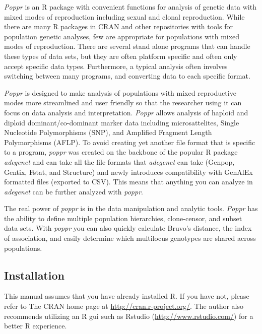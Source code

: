 \documentclass[letterpaper]{article}
\newcommand{\tab}{\hspace*{1em}}
\begin{document}
\tab\tab\textit{Poppr} is an R package with convenient functions for analysis of genetic data with mixed modes of reproduction including sexual and clonal reproduction. While there are many R packages in CRAN and other repositories with tools for population genetic analyses, few are appropriate for populations with mixed modes of reproduction. There are several stand alone programs that can handle these types of data sets, but they are often platform specific and often only accept specific data types. Furthermore, a typical analysis often involves switching between many programs, and converting data to each specific format.

\textit{Poppr} is designed to make analysis of populations with mixed reproductive modes more streamlined and user friendly so that the researcher using it can focus on data analysis and interpretation. \textit{Poppr} allows analysis of haploid and diploid dominant/co-dominant marker data including microsattelites, Single Nucleotide Polymorphisms (SNP), and Amplified Fragment Length Polymorphisms (AFLP). To avoid creating yet another file format that is specific to a program, \textit{poppr} was created on the backbone of the popular R package \textit{adegenet} and can take all the file formats that \textit{adegenet} can take (Genpop, Gentix, Fstat, and Structure) and newly introduces compatibility with GenAlEx formatted files (exported to CSV). This means that anything you can analyze in \textit{adegenet} can be further analyzed with \textit{poppr}.

The real power of \textit{poppr} is in the data manipulation and analytic tools. \textit{Poppr} has the ability to define multiple population hierarchies, clone-censor, and subset data sets. With \textit{poppr} you can also quickly calculate Bruvo's distance, the index of association, and easily determine which multilocus genotypes are shared across populations.
\subsection{Installation}\label{intro:install}

\tab\tab This manual assumes that you have already installed R. If you have not, please refer to The CRAN home page at \url{http://cran.r-project.org/}. The author also recommends utilizing an R gui such as Rstudio (\url{http://www.rstudio.com/}) for a better R experience. 
\end{document}
